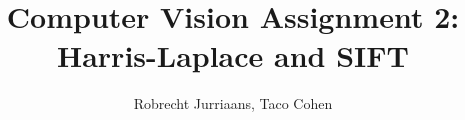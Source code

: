 \documentclass[a4paper,10pt]{article}
\title{Computer Vision Assignment 2: Harris-Laplace and SIFT}
\author{Robrecht Jurriaans, Taco Cohen}
\begin{document}
\maketitle

\begin{abstract}

\end{abstract}

\section{}
\end{document}
